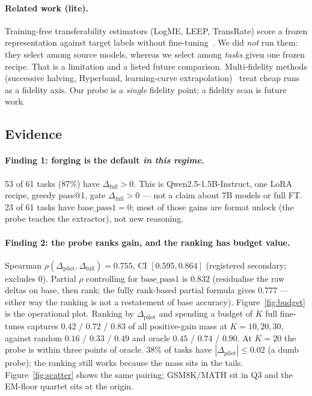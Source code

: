 \paragraph{Related work (lite).}
Training-free transferability estimators (LogME, LEEP,
TransRate) score a frozen representation against target labels
without fine-tuning~\citep{you2021logme,nguyen2020leep,huang2021transrate}.
We did \emph{not} run them: they select among source models, whereas
we select among \emph{tasks} given one frozen recipe. That is a
limitation and a listed future comparison.
Multi-fidelity methods (successive halving, Hyperband, learning-curve
extrapolation)~\citep{jamieson2016sh,li2018hyperband} treat cheap
runs as a fidelity axis. Our probe is a \emph{single} fidelity
point; a fidelity scan is future work.

\subsection{Evidence}
\label{sec:evidence}
\paragraph{Finding 1: forging is the default \emph{in this regime}.}
53 of 61 tasks (87\%) have $\Delta_{\mathrm{full}}>0$.
This is Qwen2.5-1.5B-Instruct, one LoRA recipe, greedy pass@1, gate
$\Delta_{\mathrm{full}}>0$ --- not a claim about 7B models or full
FT. 23 of 61 tasks have $\mathrm{base\_pass1}=0$; most of those
gains are format unlock (the probe teaches the extractor), not
new reasoning.

\paragraph{Finding 2: the probe ranks gain, and the ranking has
budget value.}
Spearman $\rho(\Delta_{\mathrm{pilot}},\Delta_{\mathrm{full}})=0.755$,
CI $[0.595,0.864]$ (registered secondary; excludes 0).
Partial $\rho$ controlling for $\mathrm{base\_pass1}$ is $0.832$
(residualise the raw deltas on base, then rank; the fully
rank-based partial formula gives $0.777$ --- either way the
ranking is not a restatement of base accuracy).
Figure~\ref{fig:budget} is the operational plot. Ranking by
$\Delta_{\mathrm{pilot}}$ and spending a budget of $K$ full
fine-tunes captures $0.42$ / $0.72$ / $0.83$ of all positive-gain
mass at $K{=}10,20,30$, against random $0.16$ / $0.33$ / $0.49$
and oracle $0.45$ / $0.74$ / $0.90$.
At $K{=}20$ the probe is within three points of oracle. 38\% of
tasks have $|\Delta_{\mathrm{pilot}}|\le 0.02$ (a dumb probe);
the ranking still works because the mass sits in the tails.
Figure~\ref{fig:scatter} shows the same pairing; GSM8K/MATH sit in
Q3 and the EM-floor quartet sits at the origin.

